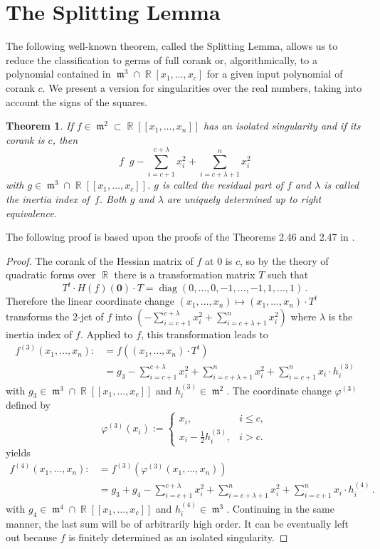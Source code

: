 \documentclass[noend]{amsproc}
\newtheorem{theorem}{Theorem}
\DeclareMathOperator{\requiv}{\overset{r}{\sim}}
\DeclareMathOperator{\m}{\mathfrak{m}}
\DeclareMathOperator{\diag}{diag}
\DeclareMathOperator{\R}{\mathbb{R}}
\begin{document}
\section{The Splitting Lemma}\label{TheSplittingLemma}

The following well-known theorem, called the Splitting Lemma, allows us to
reduce the classification to germs of full corank or, algorithmically, to
a polynomial contained in $\m^3 \cap \R[x_1,\ldots,x_c]$ for a given input
polynomial of corank $c$. We present a version for singularities over the real
numbers, taking into account the signs of the squares.

\begin{theorem}\label{SplittingLemma}
If $f \in \m^2 \subset \R[[x_1,\ldots,x_n]]$ has an isolated singularity and if
its corank is $c$, then
\[
f \requiv g -\sum_{i=c+1}^{c+\lambda} x_i^2 +\sum_{i=c+\lambda+1}^n x_i^2
\]
with $g \in \m^3 \cap \R[[x_1,\ldots,x_c]]$. $g$ is called the residual part of
$f$ and $\lambda$ is called the inertia index of~$f$. Both $g$ and $\lambda$
are uniquely determined up to right equivalence.
\end{theorem}

The following proof is based upon the proofs of the Theorems 2.46 and 2.47 in
\cite{GLS2007}.

\begin{proof}
The corank of the Hessian matrix of $f$ at $0$ is $c$, so by the theory of
quadratic forms over $\R$ there is a transformation matrix $T$ such that
\[
T^t \cdot H(f)(\mathbf{0}) \cdot T = \diag(0,\ldots,0,-1,\ldots,-1,1,\ldots,1)
\,.
\]
Therefore the linear coordinate change
$(x_1,\ldots,x_n) \mapsto (x_1,\ldots,x_n) \cdot T^t$ transforms the 2-jet of
$f$ into
$\left(-\sum_{i=c+1}^{c+\lambda} x_i^2 +\sum_{i=c+\lambda+1}^n x_i^2\right)$
where $\lambda$ is the inertia index of $f$.
Applied to $f$, this transformation leads to
\begin{align*}
f^{(3)} (x_1,\ldots,x_n)
  :\!&= f((x_1,\ldots,x_n) \cdot T^t) \\
  &= g_3
  -\sum_{i=c+1}^{c+\lambda} x_i^2 +\sum_{i=c+\lambda+1}^n x_i^2
  +\sum_{i=c+1}^n x_i\cdot h_i^{(3)}
\end{align*}
with $g_3 \in \m^3 \cap \R[[x_1,\ldots,x_c]]$ and $h_i^{(3)} \in \m^2$. The
coordinate change $\varphi^{(3)}$ defined by
\[
\varphi^{(3)}(x_i) :=
\begin{cases}
x_i, &i \leq c, \\
x_i-\frac{1}{2}h_i^{(3)}, &i > c.
\end{cases}
\]
yields
\begin{align*}
f^{(4)} (x_1,\ldots,x_n)
  :\!&= f^{(3)}(\varphi^{(3)}(x_1,\ldots,x_n)) \\
  &= g_3 +g_4
  -\sum_{i=c+1}^{c+\lambda} x_i^2 +\sum_{i=c+\lambda+1}^n x_i^2
  +\sum_{i=c+1}^n x_i\cdot h_i^{(4)} \,.
\end{align*}
with $g_4 \in \m^4 \cap \R[[x_1,\ldots,x_c]]$ and $h_i^{(4)} \in \m^3$.
Continuing in the same manner, the last sum will be of arbitrarily high order.
It can be eventually left out because $f$ is finitely determined as an isolated
singularity.
\end{proof}
\end{document}
